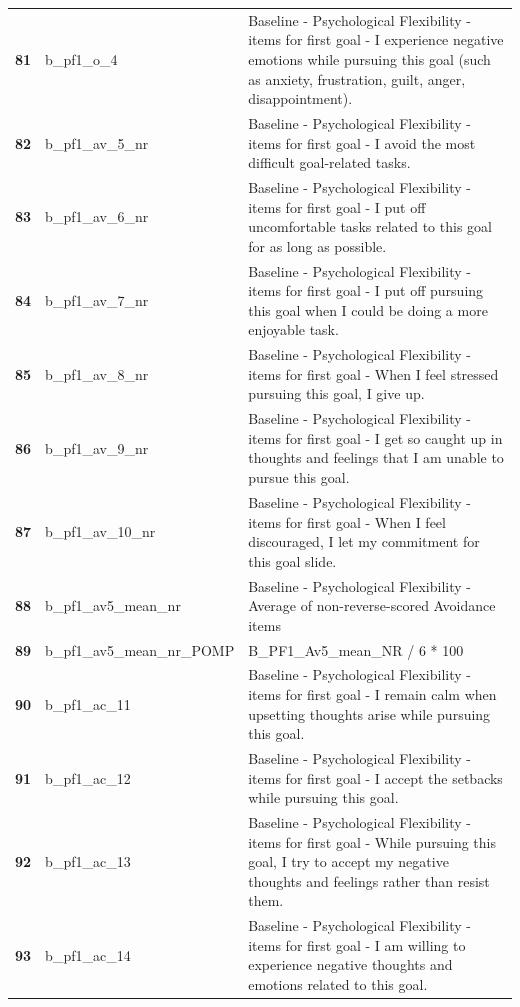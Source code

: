 \documentclass[
  letterpaper,
  DIV=11,
  numbers=noendperiod]{scrartcl}
\begin{document}
\begin{longtable}[t]{>{}cll}
\textbf{81} & b\_pf1\_o\_4 & Baseline - Psychological Flexibility - items for first goal - I experience negative emotions while pursuing this goal (such as anxiety, frustration, guilt, anger, disappointment).\\
\textbf{82} & b\_pf1\_av\_5\_nr & Baseline - Psychological Flexibility - items for first goal - I avoid the most difficult goal-related tasks.\\
\textbf{83} & b\_pf1\_av\_6\_nr & Baseline - Psychological Flexibility - items for first goal - I put off uncomfortable tasks related to this goal for as long as possible.\\
\textbf{84} & b\_pf1\_av\_7\_nr & Baseline - Psychological Flexibility - items for first goal - I put off pursuing this goal when I could be doing a more enjoyable task.\\
\textbf{85} & b\_pf1\_av\_8\_nr & Baseline - Psychological Flexibility - items for first goal - When I feel stressed pursuing this goal, I give up.\\
\addlinespace
\textbf{86} & b\_pf1\_av\_9\_nr & Baseline - Psychological Flexibility - items for first goal - I get so caught up in thoughts and feelings that I am unable to pursue this goal.\\
\textbf{87} & b\_pf1\_av\_10\_nr & Baseline - Psychological Flexibility - items for first goal - When I feel discouraged, I let my commitment for this goal slide.\\
\textbf{88} & b\_pf1\_av5\_mean\_nr & Baseline - Psychological Flexibility - Average of non-reverse-scored Avoidance items\\
\textbf{89} & b\_pf1\_av5\_mean\_nr\_POMP & B\_PF1\_Av5\_mean\_NR / 6 * 100\\
\textbf{90} & b\_pf1\_ac\_11 & Baseline - Psychological Flexibility - items for first goal - I remain calm when upsetting thoughts arise while pursuing this goal.\\
\addlinespace
\textbf{91} & b\_pf1\_ac\_12 & Baseline - Psychological Flexibility - items for first goal - I accept the setbacks while pursuing this goal.\\
\textbf{92} & b\_pf1\_ac\_13 & Baseline - Psychological Flexibility - items for first goal - While pursuing this goal, I try to accept my negative thoughts and feelings rather than resist them.\\
\textbf{93} & b\_pf1\_ac\_14 & Baseline - Psychological Flexibility - items for first goal - I am willing to experience negative thoughts and emotions related to this goal.\\

\end{longtable}
\end{document}

